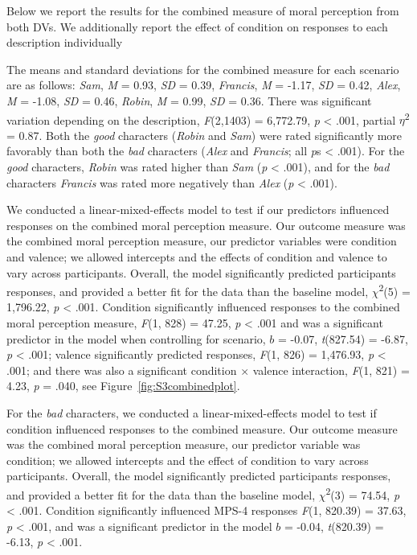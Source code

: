 \documentclass[
  man,floatsintext]{apa6}
\begin{document}
Below we report the results for the combined measure of moral perception from both DVs. We additionally report the effect of condition on responses to each description individually

The means and standard deviations for the combined measure for each scenario are as follows:
\emph{Sam},
\emph{M} = 0.93, \emph{SD} = 0.39,
\emph{Francis},
\emph{M} = -1.17, \emph{SD} = 0.42,
\emph{Alex},
\emph{M} = -1.08, \emph{SD} = 0.46,
\emph{Robin},
\emph{M} = 0.99, \emph{SD} = 0.36. There was significant variation depending on the description, \emph{F}(2,1403) = 6,772.79, \emph{p} \textless{} .001, partial \(\eta\)\textsuperscript{2} = 0.87. Both the \emph{good} characters (\emph{Robin} and \emph{Sam}) were rated significantly more favorably than both the \emph{bad} characters (\emph{Alex} and \emph{Francis}; all \emph{p}s \textless{} .001). For the \emph{good} characters, \emph{Robin} was rated higher than \emph{Sam} (\emph{p} \textless{} .001), and for the \emph{bad} characters \emph{Francis} was rated more negatively than \emph{Alex} (\emph{p} \textless{} .001).

We conducted a linear-mixed-effects model to test if our predictors influenced responses on the combined moral perception measure. Our outcome measure was the combined moral perception measure, our predictor variables were condition and valence; we allowed intercepts and the effects of condition and valence to vary across participants.
Overall, the model significantly predicted participants responses, and provided a better fit for the data than the baseline model,
\(\chi\)\textsuperscript{2}(5) = 1,796.22, \emph{p} \textless{} .001.
Condition significantly influenced responses to the combined moral perception measure,
\emph{F}(1, 828) = 47.25, \emph{p} \textless{} .001
and was a significant predictor in the model when controlling for scenario, \(b\) = -0.07, \emph{t}(827.54) = -6.87, \emph{p} \textless{} .001;
valence significantly predicted responses,
\emph{F}(1, 826) = 1,476.93, \emph{p} \textless{} .001;
and there was also a significant condition \(\times\) valence interaction,
\emph{F}(1, 821) = 4.23, \emph{p} = .040, see Figure~\ref{fig:S3combinedplot}.

For the \emph{bad} characters, we conducted a linear-mixed-effects model to test if condition influenced responses to the combined measure. Our outcome measure was the combined moral perception measure, our predictor variable was condition; we allowed intercepts and the effect of condition to vary across participants. Overall, the model significantly predicted participants responses, and provided a better fit for the data than the baseline model, \(\chi\)\textsuperscript{2}(3) = 74.54, \emph{p} \textless{} .001. Condition significantly influenced MPS-4 responses \emph{F}(1, 820.39) = 37.63, \emph{p} \textless{} .001, and was a significant predictor in the model \(b\) = -0.04, \emph{t}(820.39) = -6.13, \emph{p} \textless{} .001.
\end{document}
